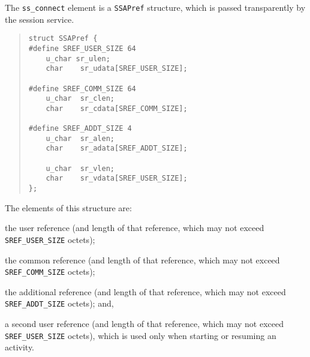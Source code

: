 The \verb"ss_connect" element is a \verb"SSAPref" structure,
which is passed transparently by the session service.
\begin{quote}\small\begin{verbatim}
struct SSAPref {
#define SREF_USER_SIZE 64
    u_char sr_ulen;
    char    sr_udata[SREF_USER_SIZE];

#define SREF_COMM_SIZE 64
    u_char  sr_clen;
    char    sr_cdata[SREF_COMM_SIZE];

#define SREF_ADDT_SIZE 4
    u_char  sr_alen;
    char    sr_adata[SREF_ADDT_SIZE];

    u_char  sr_vlen;
    char    sr_vdata[SREF_USER_SIZE];
};
\end{verbatim}\end{quote}
The elements of this structure are:\label{SSAPref}
\begin{describe}
\item[\verb"sr\_udata"/\verb"sr\_ulen":] the user reference (and length of
that reference, which may not exceed \verb"SREF_USER_SIZE" octets);

\item[\verb"sr\_cdata"/\verb"sr\_clen":] the common reference (and length of
that reference, which may not exceed \verb"SREF_COMM_SIZE" octets);

\item[\verb"sr\_adata"/\verb"sr\_adata":] the additional reference (and length
of that reference, which may not exceed \verb"SREF_ADDT_SIZE" octets);
and,

\item[\verb"sr\_vdata"/\verb"sr\_vlen":] a second user reference (and length
of that reference, which may not exceed \verb"SREF_USER_SIZE" octets),
which is used only when starting or resuming an activity.
\end{describe}

